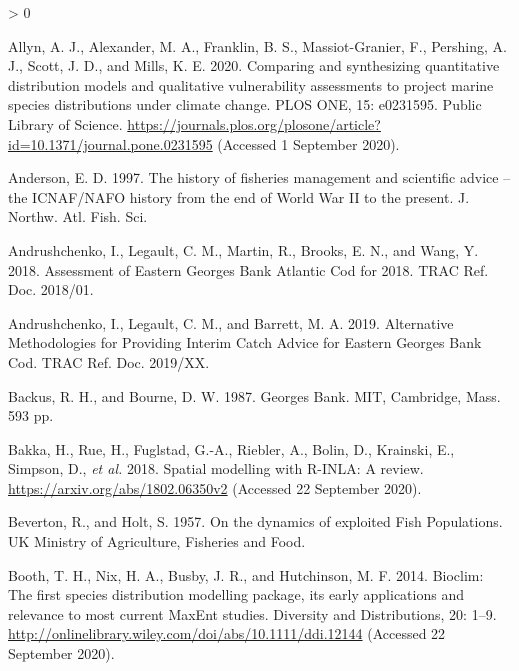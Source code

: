 \documentclass[
]{article}
\newlength{\cslhangindent}
\newenvironment{CSLReferences}[2] %
 {%
  \setlength{\parindent}{0pt}
  \ifodd #1 \everypar{\setlength{\hangindent}{\cslhangindent}}\ignorespaces\fi
  \ifnum #2 > 0
  \setlength{\parskip}{#2\baselineskip}
  \fi
 }%
 {}
\begin{document}
\hypertarget{refs}{}
\begin{CSLReferences}{1}{0}
\leavevmode\hypertarget{ref-allynComparingSynthesizingQuantitative2020}{}%
Allyn, A. J., Alexander, M. A., Franklin, B. S., Massiot-Granier, F., Pershing, A. J., Scott, J. D., and Mills, K. E. 2020. Comparing and synthesizing quantitative distribution models and qualitative vulnerability assessments to project marine species distributions under climate change. PLOS ONE, 15: e0231595. {Public Library of Science}. \url{https://journals.plos.org/plosone/article?id=10.1371/journal.pone.0231595} (Accessed 1 September 2020).

\leavevmode\hypertarget{ref-andersonHistoryFisheriesManagement1997}{}%
Anderson, E. D. 1997. The history of fisheries management and scientific advice -- the {ICNAF}/{NAFO} history from the end of {World War II} to the present. J. Northw. Atl. Fish. Sci.

\leavevmode\hypertarget{ref-andrushchenkoAssessmentEasternGeorges2018}{}%
Andrushchenko, I., Legault, C. M., Martin, R., Brooks, E. N., and Wang, Y. 2018. Assessment of {Eastern Georges Bank Atlantic Cod} for 2018. TRAC Ref. Doc. 2018/01.

\leavevmode\hypertarget{ref-andrushchenkoAlternativeMethodologiesProviding2019}{}%
Andrushchenko, I., Legault, C. M., and Barrett, M. A. 2019. Alternative {Methodologies} for {Providing Interim Catch Advice} for {Eastern Georges Bank Cod}. TRAC Ref. Doc. 2019/XX.

\leavevmode\hypertarget{ref-backusGeorgesBank1987}{}%
Backus, R. H., and Bourne, D. W. 1987. Georges {Bank}. {MIT}, {Cambridge, Mass}. 593 pp.

\leavevmode\hypertarget{ref-bakkaSpatialModellingRINLA2018}{}%
Bakka, H., Rue, H., Fuglstad, G.-A., Riebler, A., Bolin, D., Krainski, E., Simpson, D., \emph{et al.} 2018. Spatial modelling with {R}-{INLA}: {A} review. \url{https://arxiv.org/abs/1802.06350v2} (Accessed 22 September 2020).

\leavevmode\hypertarget{ref-bevertonDynamicsExploitedFish1957}{}%
Beverton, R., and Holt, S. 1957. On the dynamics of exploited {Fish Populations}. {UK Ministry of Agriculture, Fisheries and Food}.

\leavevmode\hypertarget{ref-boothBioclimFirstSpecies2014}{}%
Booth, T. H., Nix, H. A., Busby, J. R., and Hutchinson, M. F. 2014. Bioclim: The first species distribution modelling package, its early applications and relevance to most current {MaxEnt} studies. Diversity and Distributions, 20: 1--9. \url{http://onlinelibrary.wiley.com/doi/abs/10.1111/ddi.12144} (Accessed 22 September 2020).


\end{CSLReferences}
\end{document}
